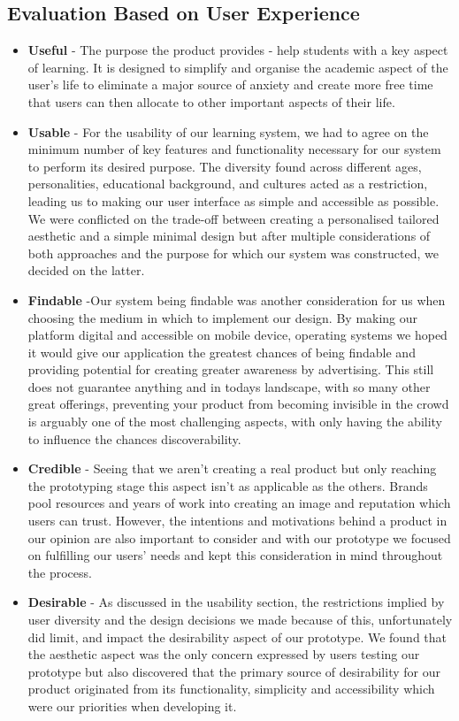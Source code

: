 \documentclass{article}
\begin{document}
	\subsection{Evaluation Based on User Experience}
	\begin{itemize}
		\item \textbf{Useful} - The purpose the product provides - help students with a key aspect of learning. It is designed to simplify and organise the academic aspect of the user’s life to eliminate a major source of anxiety and create more free time that users can then allocate to other important aspects of their life.
		\item \textbf{Usable} - For the usability of our learning system, we had to agree on the minimum number of key features and functionality necessary for our system to perform its desired purpose. The diversity found across different ages, personalities, educational background, and cultures acted as a restriction, leading us to making our user interface as simple and accessible as possible. We were conflicted on the trade-off between creating a personalised tailored aesthetic and a simple minimal design but after multiple considerations of both approaches and the purpose for which our system was constructed, we decided on the latter.
		\item \textbf{Findable} -Our system being findable was another consideration for us when choosing the medium in which to implement our design. By making our platform digital and accessible on mobile device, operating systems we hoped it would give our application the greatest chances of being findable and providing potential for creating greater awareness by advertising. This still does not guarantee anything and in todays landscape, with so many other great offerings, preventing your product from becoming invisible in the crowd is arguably one of the most challenging aspects, with only having the ability to influence the chances discoverability.
		\item \textbf{Credible} - Seeing that we aren’t creating a real product but only reaching the prototyping stage this aspect isn’t as applicable as the others. Brands pool resources and years of work into creating an image and reputation which users can trust. However, the intentions and motivations behind a product in our opinion are also important to consider and with our prototype we focused on fulfilling our users’ needs and kept this consideration in mind throughout the process.
		\item \textbf{Desirable} - As discussed in the usability section, the restrictions implied by user diversity and the design decisions we made because of this, unfortunately did limit, and impact the desirability aspect of our prototype. We found that the aesthetic aspect was the only concern expressed by users testing our prototype but also discovered that the primary source of desirability for our product originated from its functionality, simplicity and accessibility which were our priorities when developing it.

\end{itemize}
\end{document}
